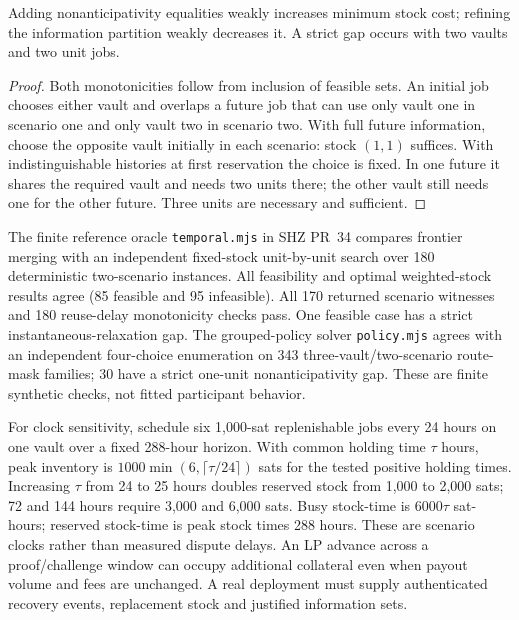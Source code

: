 \begin{proposition}
\label{prop:shz-nonanticipative}
Adding nonanticipativity equalities weakly increases minimum stock cost; refining the information partition weakly decreases it. A strict gap occurs with two vaults and two unit jobs.
\end{proposition}
\begin{proof}
Both monotonicities follow from inclusion of feasible sets. An initial job chooses either vault and overlaps a future job that can use only vault one in scenario one and only vault two in scenario two. With full future information, choose the opposite vault initially in each scenario: stock $(1,1)$ suffices. With indistinguishable histories at first reservation the choice is fixed. In one future it shares the required vault and needs two units there; the other vault still needs one for the other future. Three units are necessary and sufficient.
\end{proof}

The finite reference oracle \texttt{temporal.mjs} in SHZ PR~34 compares frontier merging with an independent fixed-stock unit-by-unit search over 180 deterministic two-scenario instances. All feasibility and optimal weighted-stock results agree (85 feasible and 95 infeasible). All 170 returned scenario witnesses and 180 reuse-delay monotonicity checks pass. One feasible case has a strict instantaneous-relaxation gap. The grouped-policy solver \texttt{policy.mjs} agrees with an independent four-choice enumeration on 343 three-vault/two-scenario route-mask families; 30 have a strict one-unit nonanticipativity gap. These are finite synthetic checks, not fitted participant behavior.

For clock sensitivity, schedule six 1,000-sat replenishable jobs every 24 hours on one vault over a fixed 288-hour horizon. With common holding time $\tau$ hours, peak inventory is $1000\min(6,\lceil\tau/24\rceil)$ sats for the tested positive holding times. Increasing $\tau$ from 24 to 25 hours doubles reserved stock from 1,000 to 2,000 sats; 72 and 144 hours require 3,000 and 6,000 sats. Busy stock-time is $6000\tau$ sat-hours; reserved stock-time is peak stock times 288 hours. These are scenario clocks rather than measured dispute delays. An LP advance across a proof/challenge window can occupy additional collateral even when payout volume and fees are unchanged. A real deployment must supply authenticated recovery events, replacement stock and justified information sets.

